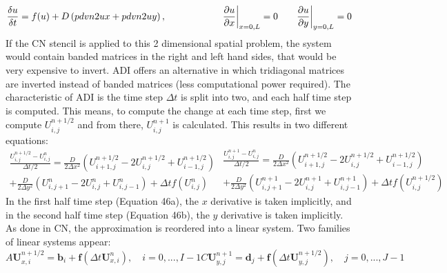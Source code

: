 \begin{equation}
    \frac{\delta u}{\delta t} =  f(u) + D\left(\\pdvn{2}{u}{x} + \\pdvn{2}{u}{y}\right) ,   \quad \quad \quad \quad \quad \quad \pdv{u}{x}\biggr\rvert_{x=0,L}=0 \quad \quad \pdv{u}{y}\biggr\rvert_{y=0,L}=0
\end{equation}
If the CN stencil is applied to this 2 dimensional spatial problem, the system would contain banded matrices in the right and left hand sides, that would be very expensive to invert. ADI offers an alternative in which tridiagonal matrices are inverted instead of banded matrices (less computational power required). The characteristic of ADI is the time step $\Delta t$ is split into two, and each half time step is computed. This means, to compute the change at each time step, first we compute $U^{n+1/2}_{i,j} $ and from there,    $U^{n+1}_{i,j} $ is calculated. This results in two different equations:
\begin{subequations}
    \begin{equation}
        \begin{split}
            \frac{U^{n+1/2}_{i,j} - U^{n}_{i,j} }{\Delta t/2} = \frac{D}{2\Delta x^{2}}\left( U^{n+1/2}_{i+1,j} -  2U^{n+1/2}_{i,j} + U^{n+1/2}_{i-1,j}\right)  \\+ \frac{D}{2\Delta y^{2}}\left( U^{n}_{i,j+1} -  2U^{n}_{i,j} + U^{n}_{i,j-1}\right)  + \Delta t f(U^{n}_{i,j})
        \end{split}
    \end{equation}
    \begin{equation}
        \begin{split}
            \frac{U^{n+1}_{i,j} - U^{n}_{i,j} }{\Delta t/2} = \frac{D}{2\Delta x^{2}}\left( U^{n+1/2}_{i+1,j} -  2U^{n+1/2}_{i,j} + U^{n+1/2}_{i-1,j}\right)  \\+ \frac{D}{2\Delta y^{2}}\left( U^{n+1}_{i,j+1} -  2U^{n+1}_{i,j} + U^{n+1}_{i,j-1}\right)  + \Delta t f(U^{n+1/2}_{i,j})
        \end{split}
    \end{equation}
\end{subequations}
In the first half time step (Equation 46a), the $x$ derivative is taken implicitly, and in the second half time step (Equation 46b), the $y$ derivative is taken implicitly. As done in CN, the approximation is reordered into a linear system. Two families of linear systems appear:
\begin{subequations}
    \begin{equation}
        A\textbf{U}^{n+1/2}_{x,i} = \textbf{b}_{i} + \textbf{f}(\Delta t \textbf{U}^{n}_{x,i}), \quad i=0,...,I-1
    \end{equation}
    \begin{equation}
        C\textbf{U}^{n+1}_{y,j} = \textbf{d}_{j} + \textbf{f}(\Delta t \textbf{U}^{n+1/2}_{y,j}), \quad j=0,...,J-1
    \end{equation}
\end{subequations}
